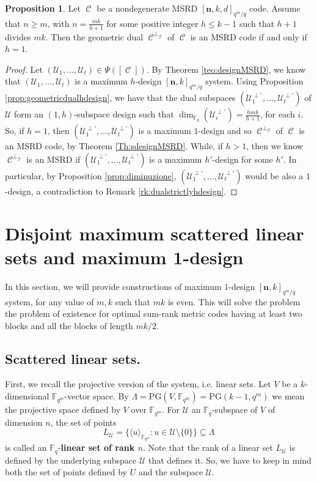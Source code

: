 \documentclass[11pt]{amsart}
\DeclareMathOperator{\C}{\mathcal{C}}
\theoremstyle{definition}
\newtheorem{proposition}[theorem]{Proposition}
\newcommand{\F}{{\mathbb F}}
\newcommand{\U}{{\mathcal{U}}}
\newcommand{\bfn}{\mathbf {n}}
\newcommand{\fq}{{\mathbb F}_{q}}
\newcommand{\la}{\langle}
\newcommand{\ra}{\rangle}
\newcommand{\PG}{\mathrm{PG}}
\newcommand{\Fmnkd}{[\bfn,k,d]_{q^m/q}}
\begin{document}
{%
\begin{proposition}
    Let $\C$ be a nondegenerate MSRD $\Fmnkd$ code. Assume that $n \geq m$, with $n=\frac{mk}{h+1}$ for some positive integer $h \leq k-1$ such that $h+1$ divides $mk$.  Then the geometric dual $\C^{\perp_{\mathcal{G}}}$ of $\C$ is an MSRD code if and only if $h=1$.
\end{proposition}
\begin{proof}
Let $(\mathcal{U}_1,\ldots,\mathcal{U}_t) \in \Psi([\C])$. By Theorem \ref{teo:designMSRD}, we know that $(\mathcal{U}_1,\ldots,\mathcal{U}_t)$ is a maximum $h$-design $[\bfn,k]_{q^m/q}$ system. Using Proposition \ref{prop:geometricdualhdesign}, we have that the dual subspaces $(\U_1^{\perp'},\ldots,\U_t^{\perp'})$ of $\U$ form an $(1,h)$-subspace design such that $\dim_{\F_q}(\U_i^{\perp'})=\frac{hmk}{h+1}$, for each $i$. So, if $h=1$, then $(\U_1^{\perp'},\ldots,\U_t^{\perp'})$ is a maximum $1$-design and so $\C^{\perp_{\mathcal{G}}}$ of $\C$ is an MSRD code, by Theorem \ref{Th:sdesignMSRD}. While, if $h>1$, then we know
 $\C^{\perp_{\mathcal{G}}}$ is an MSRD if   $(\U_1^{\perp'},\ldots,\U_t^{\perp'})$ is a maximum $h'$-design for some $h'$. In particular, by Proposition \ref{prop:diminuzione}, $(\U_1^{\perp'},\ldots,\U_t^{\perp'})$ would be also a $1$-design, a contradiction to Remark \ref{rk:dualstrictlyhdesign}. 
\end{proof}



\section{Disjoint maximum scattered linear sets and 
maximum 1-design}

In this section, we will provide constructions of maximum $1$-design $[\bfn,k]_{q^m/q}$ system, for any value of $m,k$ such that $mk$ is even. This will solve the problem the problem of existence for optimal sum-rank metric codes having at least two blocks and all the blocks of length $mk/2$.

\medskip 

\subsection{Scattered linear sets.} 


First, we recall the projective version of the system, i.e. linear sets.
Let $V$ be a $k$-dimensional $\F_{q^m}$-vector space. By $\Lambda=\PG(V,\F_{q^m})=\PG(k-1,q^m)$ we mean the projective space defined by $V$ over $\F_{q^m}$. For $\U $ an $\fq$-subspace of $V$ of dimension $n$, the set of points
\[ L_{\U}=\{\la {u} \ra_{\mathbb{F}_{q^m}} : {u}\in \U\setminus \{{ 0} \}\}\subseteq \Lambda \]
is called an $\fq$-\textbf{linear set of rank $n$}. Note that the rank of a linear set $L_{\U}$
is defined by the underlying subspace $\U$ that defines it. So, we have to keep in mind both the set of points defined by $U$ and the subspace $\U$.

}
\end{document}
